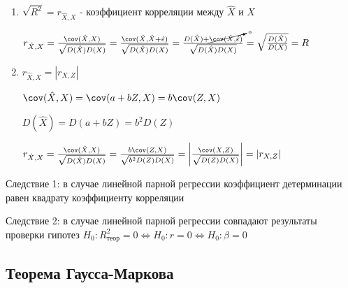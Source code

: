 \documentclass[12pt]{article}
\begin{document}
\begin{enumerate}
    \item $\sqrt{R^2} = r_{\hat X, X}$ - коэффициент корреляции между $\hat X$ и $X$
    \begin{MyProof}
        $r_{\hat X, X} = \frac{\cov (\hat X, X)}{\sqrt{D(\hat X) D(X)}} = \frac{\cov (\hat X, \hat X + \hat \varepsilon)}{\sqrt{D(\hat X) D(X)}} = 
        \frac{D(\hat X) + \cancelto{0}{\cov (\hat X, \hat \varepsilon)}}{\sqrt{D(\hat X) D(X)}} = \sqrt{\frac{D(\hat X)}{D(X)}} = R$
    \end{MyProof}

    \item $r_{\hat X, X} = |r_{X, Z}|$

    \begin{MyProof}
        $\cov (\hat X, X) = \cov (a + bZ, X) = b \cov (Z, X)$

        $D(\hat X) = D(a + b Z) = b^2 D(Z)$

        $r_{\hat X, X} = \frac{\cov (\hat X, X)}{\sqrt{D(\hat X) D(X)}} = \frac{b \cov (Z, X)}{\sqrt{b^2 D(Z) D(X)}} = \left|\frac{\cov (X, Z)}{\sqrt{D(Z) D(X)}}\right| = |r_{X, Z}|$
    \end{MyProof}
\end{enumerate}

Следствие 1: в случае линейной парной регрессии коэффициент детерминации равен квадрату коэффициенту корреляции

Следствие 2: в случае линейной парной регрессии совпадают результаты проверки гипотез 
$H_0 : R^2_{\text{теор}} = 0 \Longleftrightarrow H_0 : r = 0 \Longleftrightarrow H_0 : \beta = 0$

\subsection{Теорема Гаусса-Маркова}
\end{document}
